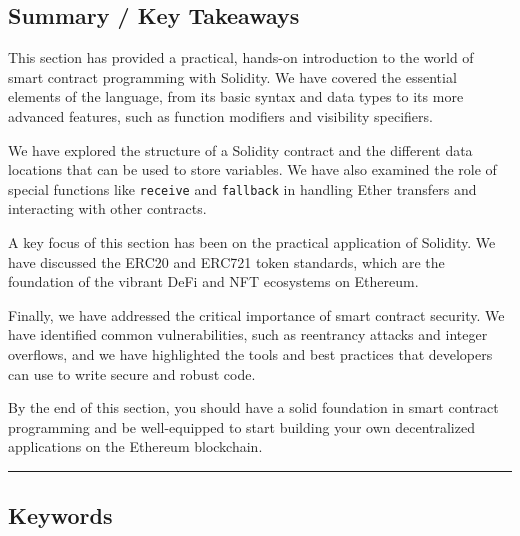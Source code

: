 \subsection{Summary / Key Takeaways}\label{summary-key-takeaways}

This section has provided a practical, hands-on introduction to the
world of smart contract programming with Solidity. We have covered the
essential elements of the language, from its basic syntax and data types
to its more advanced features, such as function modifiers and visibility
specifiers.

We have explored the structure of a Solidity contract and the different
data locations that can be used to store variables. We have also
examined the role of special functions like \texttt{receive} and
\texttt{fallback} in handling Ether transfers and interacting with other
contracts.

A key focus of this section has been on the practical application of
Solidity. We have discussed the ERC20 and ERC721 token standards, which
are the foundation of the vibrant DeFi and NFT ecosystems on Ethereum.

Finally, we have addressed the critical importance of smart contract
security. We have identified common vulnerabilities, such as reentrancy
attacks and integer overflows, and we have highlighted the tools and
best practices that developers can use to write secure and robust code.

By the end of this section, you should have a solid foundation in smart
contract programming and be well-equipped to start building your own
decentralized applications on the Ethereum blockchain.

\begin{center}\rule{0.5\linewidth}{0.5pt}\end{center}

\subsection{Keywords}\label{keywords}

